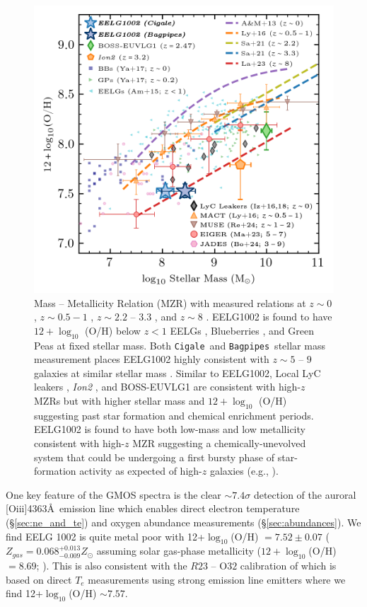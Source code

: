 \documentclass[twocolumn,tight,times,linenumbers]{aastex631}
\newcommand{\oiii}{[O{\sc iii}]}
\newcommand{\cigale}{\texttt{Cigale}}
\newcommand{\bagpipes}{\texttt{Bagpipes}}
\begin{document}
		\begin{figure}
			\centering
			\includegraphics[width=\columnwidth]{figures/MZR_EELG1002.png}
			\caption{Mass -- Metallicity Relation (MZR) with measured relations at $z \sim 0$ \citep{Andrews2013}, $z \sim 0.5 - 1$ \citep{Ly2016}, $ z\sim 2.2$ -- $3.3$ \citep{Sanders2021}, and $z \sim 8$ \citep{Langeroodi2023}. EELG1002 is found to have $12+\log_{10}$ (O/H) below $z < 1$ EELGs \citep{Amorin2015}, Blueberries \citep{Yang2017_BB}, and Green Peas \citep{Yang2017_GP} at fixed stellar mass. Both \cigale~and \bagpipes~stellar mass measurement places EELG1002 highly consistent with $z \sim 5$ -- $9$ galaxies at similar stellar mass \citep{Matthee2023, Langeroodi2023, Boyett2024}. Similar to EELG1002, Local LyC leakers \citep{Izotov2016,Izotov2018}, \textit{Ion2} \citep{deBarros2016}, and BOSS-EUVLG1 \citep{Marques-Chaves2020} are consistent with high-$z$ MZRs but with higher stellar mass and $12 + \log_{10}$ (O/H) suggesting past star formation and chemical enrichment periods. EELG1002 is found to have both low-mass and low metallicity consistent with high-$z$ MZR suggesting a chemically-unevolved system that could be undergoing a first bursty phase of star-formation activity as expected of high-$z$ galaxies (e.g., \citealt{Cohn2018}).}
			\label{fig:MZR}
		\end{figure}
	
	
		One key feature of the GMOS spectra is the clear $\sim 7.4\sigma$ detection of the auroral \oiii4363\AA~emission line which enables direct electron temperature (\S\ref{sec:ne_and_te}) and oxygen abundance measurements (\S\ref{sec:abundances}). We find EELG 1002 is quite metal poor with  12+$\log_{10}$(O/H) $ = 7.52\pm0.07$ ($Z_{gas} = 0.068^{+0.013}_{-0.009} Z_\odot$ assuming solar gas-phase metallicity ($12+\log_{10}$(O/H)$ = 8.69$; \citealt{Asplund2021}). This is also consistent with the $R23$ -- O$32$ calibration of \cite{Jiang2019} which is based on direct $T_e$ measurements using strong emission line emitters where we find 12+$\log_{10}$(O/H) $ \sim 7.57$. 
  
\end{document}
